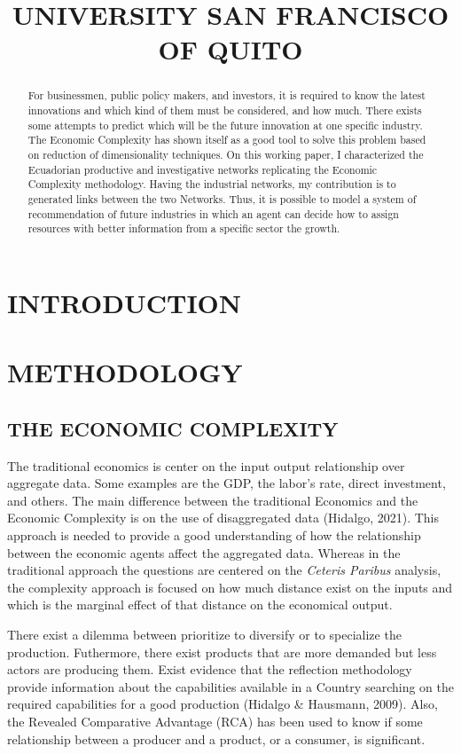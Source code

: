 \documentclass[12pt]{article}
\title{UNIVERSITY SAN FRANCISCO OF QUITO}
\begin{document}
\maketitle
\begin{abstract}

    For businessmen, public policy makers, and investors, it
is required to know the latest innovations and which
kind of them must be considered, and how much. There exists some attempts
to predict which will be the future innovation at one
specific industry. The Economic Complexity has shown itself
as a good tool to solve this problem based on reduction of
dimensionality techniques. On this working paper, 
I characterized the Ecuadorian productive and investigative
networks replicating the Economic Complexity
methodology. Having the industrial networks, my contribution 
is to generated links between the two Networks. Thus, it is 
possible to model a system of recommendation of future 
industries in which an agent can decide how to assign 
resources with better information from a specific
sector the growth.
    
\end{abstract}

\section{INTRODUCTION}

\section{METHODOLOGY}

\subsection{THE ECONOMIC COMPLEXITY}

The traditional economics is center on the input output
relationship over aggregate data. Some examples are
the GDP, the labor's rate, direct investment, and others.
The main difference between the traditional
Economics and the Economic Complexity is on the use of
disaggregated data (Hidalgo, 2021). This approach is needed
to provide a good understanding of how the relationship between
the economic agents affect the aggregated data. Whereas in the
traditional approach the questions are centered on the 
\textit{Ceteris Paribus} analysis, the complexity approach 
is focused on how much distance exist on the inputs and 
which is the marginal effect of that distance on the
economical output.

There exist a dilemma between prioritize to diversify or
to specialize the production. Futhermore, there exist
products that are more demanded but
less actors are producing them. Exist evidence that the
reflection methodology provide information about the
capabilities available in a Country searching on the required
capabilities for a good production (Hidalgo \& Hausmann, 2009).
Also, the Revealed Comparative Advantage (RCA) has been used
to know if some relationship between a producer and a product,
or a consumer, is significant.
\end{document}
